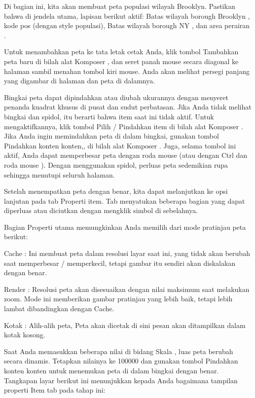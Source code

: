 \documentclass[]{book}
\begin{document}
Di bagian ini, kita akan membuat peta populasi wilayah Brooklyn. Pastikan bahwa di jendela utama, lapisan berikut aktif: Batas wilayah borough Brooklyn , kode pos (dengan style populasi), Batas wilayah borough NY , dan area perairan .

Untuk menambahkan peta ke tata letak cetak Anda, klik tombol Tambahkan peta baru di bilah alat Komposer , dan seret panah mouse secara diagonal ke halaman sambil menahan tombol kiri mouse. Anda akan melihat persegi panjang yang digambar di halaman dan peta di dalamnya.

Bingkai peta dapat dipindahkan atau diubah ukurannya dengan menyeret penanda kuadrat khusus di pusat dan sudut perbatasan. Jika Anda tidak melihat bingkai dan spidol, itu berarti bahwa item saat ini tidak aktif. Untuk mengaktifkannya, klik tombol Pilih / Pindahkan item di bilah alat Komposer . Jika Anda ingin memindahkan peta di dalam bingkai, gunakan tombol Pindahkan konten konten,, di bilah alat Komposer . Juga, selama tombol ini aktif, Anda dapat memperbesar peta dengan roda mouse (atau dengan Ctrl dan roda mouse ). Dengan menggunakan spidol, perluas peta sedemikian rupa sehingga menutupi seluruh halaman.

Setelah menempatkan peta dengan benar, kita dapat melanjutkan ke opsi lanjutan pada tab Properti item. Tab menyatukan beberapa bagian yang dapat diperluas atau diciutkan dengan mengklik simbol di sebelahnya.

Bagian Properti utama memungkinkan Anda memilih dari mode pratinjau peta berikut:

Cache : Ini membuat peta dalam resolusi layar saat ini, yang tidak akan berubah saat memperbesar / memperkecil, tetapi gambar itu sendiri akan diskalakan dengan benar.

Render : Resolusi peta akan disesuaikan dengan nilai maksimum saat melakukan zoom. Mode ini memberikan gambar pratinjau yang lebih baik, tetapi lebih lambat dibandingkan dengan Cache.

Kotak : Alih-alih peta, Peta akan dicetak di sini pesan akan ditampilkan dalam kotak kosong.

Saat Anda memasukkan beberapa nilai di bidang Skala , luas peta berubah secara dinamis. Tetapkan nilainya ke 100000 dan gunakan tombol Pindahkan konten konten untuk menemukan peta di dalam bingkai dengan benar. Tangkapan layar berikut ini menunjukkan kepada Anda bagaimana tampilan properti Item tab pada tahap ini:
\end{document}
